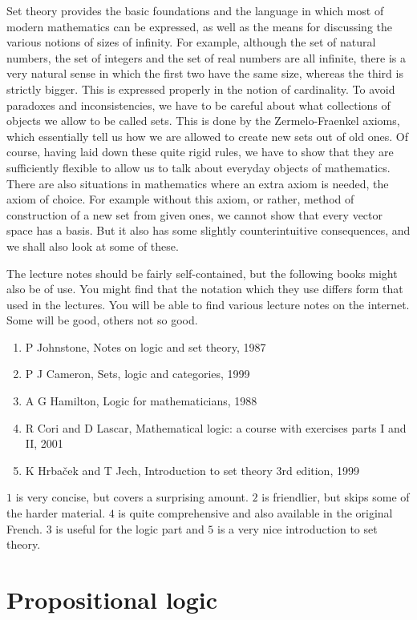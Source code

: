 Set theory provides the basic foundations and the language in which most of modern mathematics can be expressed, as well as the means for discussing the various notions of sizes of infinity. For example, although the set of natural numbers, the set of integers and the set of real numbers are all infinite, there is a very natural sense in which the first two have the same size, whereas the third is strictly bigger. This is expressed properly in the notion of cardinality. To avoid paradoxes and inconsistencies, we have to be careful about what collections of objects we allow to be called sets. This is done by the Zermelo-Fraenkel axioms, which essentially tell us how we are allowed to create new sets out of old ones. Of course, having laid down these quite rigid rules, we have to show that they are sufficiently flexible to allow us to talk about everyday objects of mathematics. There are also situations in mathematics where an extra axiom is needed, the axiom of choice. For example without this axiom, or rather, method of construction of a new set from given ones, we cannot show that every vector space has a basis. But it also has some slightly counterintuitive consequences, and we shall also look at some of these.

The lecture notes should be fairly self-contained, but the following books might also be of use. You might find that the notation which they use differs form that used in the lectures. You will be able to find various lecture notes on the internet. Some will be good, others not so good.
\begin{enumerate}
\item P Johnstone, Notes on logic and set theory, 1987
\item P J Cameron, Sets, logic and categories, 1999
\item A G Hamilton, Logic for mathematicians, 1988
\item R Cori and D Lascar, Mathematical logic: a course with exercises parts I and II, 2001
\item K Hrbaček and T Jech, Introduction to set theory 3rd edition, 1999
\end{enumerate}
$ 1 $ is very concise, but covers a surprising amount. $ 2 $ is friendlier, but skips some of the harder material. $ 4 $ is quite comprehensive and also available in the original French. $ 3 $ is useful for the logic part and $ 5 $ is a very nice introduction to set theory.

\pagebreak

\section{Propositional logic}

